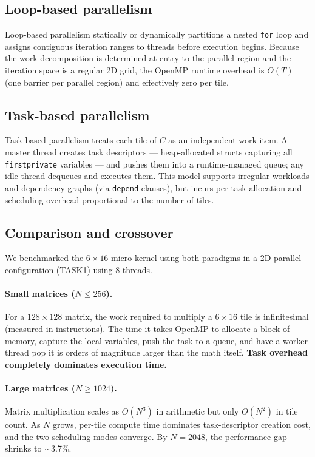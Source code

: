 \documentclass[11pt,a4paper]{article}
\begin{document}
\subsection{Loop-based parallelism}
Loop-based parallelism statically or dynamically partitions a nested \texttt{for} loop and assigns contiguous iteration ranges to threads before execution begins.
Because the work decomposition is determined at entry to the parallel region and the iteration space is a regular 2D grid, the OpenMP runtime overhead is $O(T)$ (one barrier per parallel region) and effectively zero per tile.

\subsection{Task-based parallelism}
Task-based parallelism treats each tile of $C$ as an independent work item. A master thread creates task descriptors — heap-allocated structs capturing all \texttt{firstprivate} variables — and pushes them into a runtime-managed queue; any idle thread dequeues and executes them.
This model supports irregular workloads and dependency graphs (via \texttt{depend} clauses), but incurs per-task allocation and scheduling overhead proportional to the number of tiles.

\subsection{Comparison and crossover}

We benchmarked the $6\times16$ micro-kernel using both paradigms in a 2D parallel configuration (TASK1) using 8 threads. 

\paragraph{Small matrices ($N \le 256$).}
For a $128 \times 128$ matrix, the work required to multiply a $6 \times 16$ tile is infinitesimal (measured in instructions). The time it takes OpenMP to allocate a block of memory, capture the local variables, push the task to a queue, and have a worker thread pop it is orders of magnitude larger than the math itself. \textbf{Task overhead completely dominates execution time.}

\paragraph{Large matrices ($N \ge 1024$).}
Matrix multiplication scales as $O(N^3)$ in arithmetic but only $O(N^2)$ in tile count. As $N$ grows, per-tile compute time dominates task-descriptor creation cost, and the two scheduling modes converge. By $N=2048$, the performance gap shrinks to $\sim$3.7\%.
\end{document}

